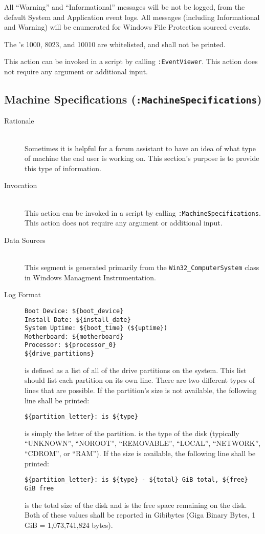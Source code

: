 All ``Warning'' and ``Informational'' messages will be not be logged, from the
default System and Application event logs. All messages (including Informational
and Warning) will be enumerated for Windows File Protection sourced events.

The 's 1000, 8023, and 10010 are whitelisted, and shall not be
printed.

This action can be invoked in a script by calling \verb|:EventViewer|.
This action does not require any argument or additional input.

\subsection{Machine Specifications (\texttt{:MachineSpecifications})}
\begin{description}
\item[Rationale] \hfill \\
Sometimes it is helpful for a forum assistant to have an idea of what type of
machine the end user is working on.  This section's purpose is to provide this
type of information.
\item[Invocation] \hfill \\
This action can be invoked in a script by calling \verb|:MachineSpecifications|.
This action does not require any argument or additional input.
\item[Data Sources] \hfill \\
This segment is generated primarily from the \verb|Win32_ComputerSystem| class
in Windows Managment Instrumentation.
\item[Log Format] \hfill 
\vspace{-\baselineskip}
\begin{verbatim}
Boot Device: ${boot_device}
Install Date: ${install_date}
System Uptime: ${boot_time} (${uptime})
Motherboard: ${motherboard}
Processor: ${processor_0}
${drive_partitions}
\end{verbatim}
 is defined as a list of all of the drive partitions
on the system.  This list should list each partition on its own line.  There are
two different types of lines that are possible.  If the partition's size is not
available, the following line shall be printed:
\vspace{-\baselineskip}
\begin{verbatim}
${partition_letter}: is ${type}
\end{verbatim}
 is simply the letter of the partition.   is
the type of the disk (typically ``UNKNOWN'', ``NOROOT'', ``REMOVABLE'', ``LOCAL'',
``NETWORK'', ``CDROM'', or ``RAM'').  If the size is available, the following
line shall be printed:
\vspace{-\baselineskip}
\begin{verbatim}
${partition_letter}: is ${type} - ${total} GiB total, ${free} GiB free
\end{verbatim}
 is the total size of the disk and  is the free space
remaining on the disk.  Both of these values shall be reported in Gibibytes
(Giga Binary Bytes, 1 GiB = 1,073,741,824 bytes).


\end{description}
